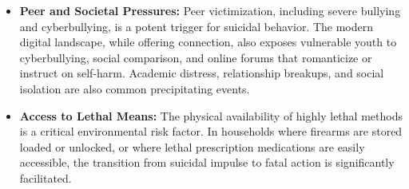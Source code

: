 \begin{itemize}
    \item \textbf{Peer and Societal Pressures:} Peer victimization, including severe bullying and cyberbullying, is a potent trigger for suicidal behavior. The modern digital landscape, while offering connection, also exposes vulnerable youth to cyberbullying, social comparison, and online forums that romanticize or instruct on self-harm. Academic distress, relationship breakups, and social isolation are also common precipitating events.
    \item \textbf{Access to Lethal Means:} The physical availability of highly lethal methods is a critical environmental risk factor. In households where firearms are stored loaded or unlocked, or where lethal prescription medications are easily accessible, the transition from suicidal impulse to fatal action is significantly facilitated.
\end{itemize}

